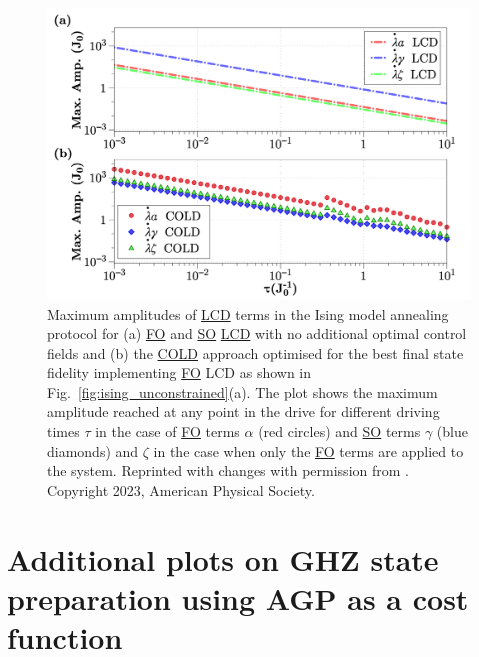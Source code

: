 \documentclass[a4paper,oneside,11pt]{book}
\newcommand{\acrref}[1]{\hyperref[acr:#1]{#1}}
\begin{document}
\begin{figure}[t!]
    \centering
    \includegraphics[width=\linewidth]{images/MaxAmp.png} \caption[Plots of maximum amplitudes of LCD drives for the Ising spin chain.]{Maximum amplitudes of \acrref{LCD} terms in the Ising model annealing protocol for (a) \acrref{FO} and \acrref{SO} \acrref{LCD} with no additional optimal control fields and (b) the \acrref{COLD} approach optimised for the best final state fidelity implementing \acrref{FO} LCD as shown in Fig.~\ref{fig:ising_unconstrained}(a). The plot shows the maximum amplitude reached at any point in the drive for different driving times $\tau$ in the case of \acrref{FO} terms $\alpha$ (red circles) and \acrref{SO} terms $\gamma$ (blue diamonds) and $\zeta$ in the case when only the \acrref{FO} terms are applied to the system. Reprinted with changes with permission from \cite{cepaite_counterdiabatic_2023}. Copyright 2023, American Physical Society.}\label{fig:ising_maxamp}
\end{figure}

\chapter{Additional plots on GHZ state preparation using AGP as a cost function}\label{app:higher_order_AGP}
\end{document}
